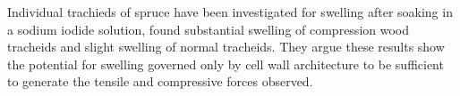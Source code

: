 Individual trachieds of spruce have been investigated for swelling after soaking in a sodium iodide solution, \cite{Burgert_2007} found substantial swelling of compression wood tracheids and slight swelling of normal tracheids. They argue these results show the potential for swelling governed only by cell wall architecture to be sufficient to generate the tensile and compressive forces observed.